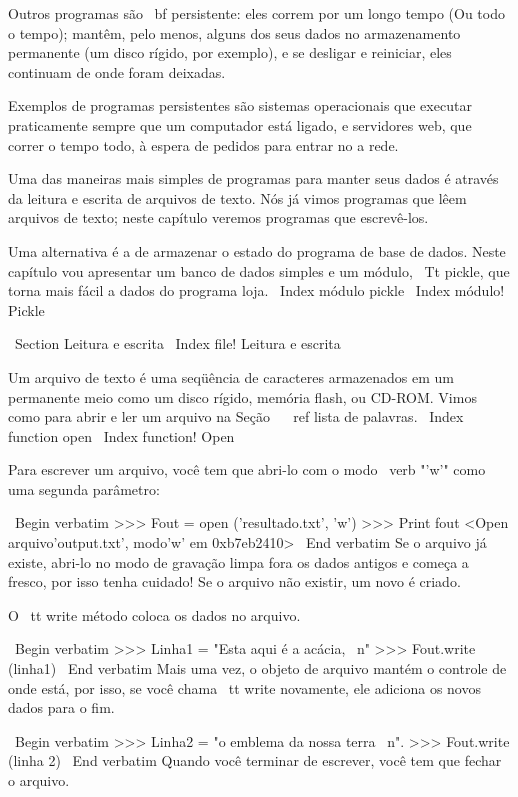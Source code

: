 \documentclass[10pt]{book}
\begin{document}
\begin {itemize}
{{{{{{{{{{Outros programas são {\ bf persistente}: eles correm por um longo tempo
(Ou todo o tempo); mantêm, pelo menos, alguns dos seus dados
no armazenamento permanente (um disco rígido, por exemplo), e
se desligar e reiniciar, eles continuam de onde foram deixadas.

Exemplos de programas persistentes são sistemas operacionais que
executar praticamente sempre que um computador está ligado, e servidores web,
que correr o tempo todo, à espera de pedidos para entrar no
a rede.

Uma das maneiras mais simples de programas para manter seus dados
é através da leitura e escrita de arquivos de texto. Nós já vimos
programas que lêem arquivos de texto; neste capítulo veremos programas
que escrevê-los.

Uma alternativa é a de armazenar o estado do programa de base de dados.
Neste capítulo vou apresentar um banco de dados simples e um módulo,
{\ Tt pickle}, que torna mais fácil a dados do programa loja.
\ Index {módulo pickle}
\ Index {módulo! Pickle}


\ Section {Leitura e escrita}
\ Index {file! Leitura e escrita}

Um arquivo de texto é uma seqüência de caracteres armazenados em um permanente
meio como um disco rígido, memória flash, ou CD-ROM. Vimos como
para abrir e ler um arquivo na Seção ~ \ ref {lista de palavras}.
\ Index {function open}
\ Index {function! Open}

Para escrever um arquivo, você tem que abri-lo com o modo \ verb "'w'" como uma segunda
parâmetro:

\ Begin {verbatim}
>>> Fout = open ('resultado.txt', 'w')
>>> Print fout
<Open arquivo'output.txt', modo'w' em 0xb7eb2410>
\ End {verbatim}
%
Se o arquivo já existe, abri-lo no modo de gravação limpa fora
os dados antigos e começa a fresco, por isso tenha cuidado!
Se o arquivo não existir, um novo é criado.

O {\ tt write} método coloca os dados no arquivo.

\ Begin {verbatim}
>>> Linha1 = "Esta aqui é a acácia, \ n"
>>> Fout.write (linha1)
\ End {verbatim}
%
Mais uma vez, o objeto de arquivo mantém o controle de onde está, por isso, se
você chama {\ tt write} novamente, ele adiciona os novos dados para o fim.

\ Begin {verbatim}
>>> Linha2 = "o emblema da nossa terra \ n".
>>> Fout.write (linha 2)
\ End {verbatim}
%
Quando você terminar de escrever, você tem que fechar o arquivo.

}}}}}}}}}}
\end{itemize}
\end{document}
